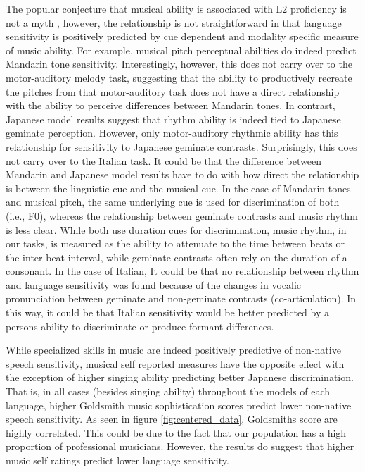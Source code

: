 \documentclass[a4paper]{article}
\begin{document}
The popular conjecture that musical ability is associated with L2 proficiency is not a myth \cite{Slevc_Miyake_2006b}, however, the relationship is not straightforward in that language sensitivity is positively predicted by cue dependent and modality specific measure of music ability. For example, musical pitch perceptual abilities do indeed predict Mandarin tone sensitivity. Interestingly, however, this does not carry over to the motor-auditory melody task, suggesting that the ability to productively recreate the pitches from that motor-auditory task does not have a direct relationship with the ability to perceive differences between Mandarin tones. In contrast, Japanese model results suggest that rhythm ability is indeed tied to Japanese geminate perception. However, only motor-auditory rhythmic ability has this relationship for sensitivity to Japanese geminate contrasts. Surprisingly, this does not carry over to the Italian task. It could be that the difference between Mandarin and Japanese model results have to do with how direct the relationship is between the linguistic cue and the musical cue. In the case of Mandarin tones and musical pitch, the same underlying cue is used for discrimination of both (i.e., F0), whereas the relationship between geminate contrasts and music rhythm is less clear. While both use duration cues for discrimination, music rhythm, in our tasks, is measured as the ability to attenuate to the time between beats or the inter-beat interval, while geminate contrasts often rely on the duration of a consonant. In the case of Italian, It could be that no relationship between rhythm and language sensitivity was found because of the changes in vocalic pronunciation between geminate and non-geminate contrasts (co-articulation). In this way, it could be that Italian sensitivity would be better predicted by a persons ability to discriminate or produce formant differences. 

While specialized skills in music are indeed positively predictive of non-native speech sensitivity, musical self reported measures have the opposite effect with the exception of higher singing ability predicting better Japanese discrimination. That is, in all cases (besides singing ability) throughout the models of each language, higher Goldsmith music sophistication scores predict lower non-native speech sensitivity. As seen in figure \ref{fig:centered_data}, Goldsmiths score are highly correlated. This could be due to the fact that our population has a high proportion of professional musicians. However, the results do suggest that higher music self ratings predict lower language sensitivity.    
\end{document}
